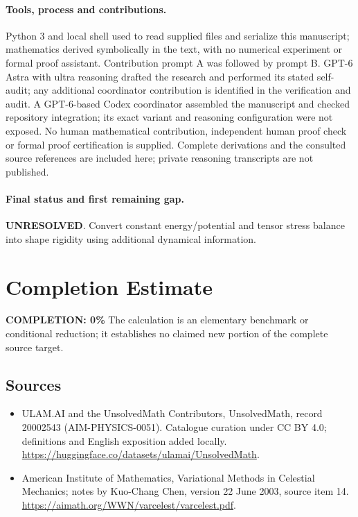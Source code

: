 \documentclass[11pt]{article}
\begin{document}
\paragraph{Tools, process and contributions.}
Python 3 and local shell used to read supplied files and serialize this manuscript; mathematics derived symbolically in the text, with no numerical experiment or formal proof assistant. Contribution prompt A was followed by prompt B. GPT-6 Astra with ultra reasoning drafted the research and performed its stated self-audit; any additional coordinator contribution is identified in the verification and audit. A GPT-6-based Codex coordinator assembled the manuscript and checked repository integration; its exact variant and reasoning configuration were not exposed. No human mathematical contribution, independent human proof check or formal proof certification is supplied. Complete derivations and the consulted source references are included here; private reasoning transcripts are not published.

\paragraph{Final status and first remaining gap.}
\textbf{UNRESOLVED}. Convert constant energy/potential and tensor stress balance into shape rigidity using additional dynamical information.

\section{Completion Estimate}
\noindent\textbf{COMPLETION: 0\%}
The calculation is an elementary benchmark or conditional reduction; it establishes no claimed new portion of the complete source target.

\subsection{Sources}
\begin{itemize}
\item[\hypertarget{source:20002543:1}{S1}] ULAM.AI and the UnsolvedMath Contributors, UnsolvedMath, record 20002543 (AIM-PHYSICS-0051). Catalogue curation under CC BY 4.0; definitions and English exposition added locally.
\url{https://huggingface.co/datasets/ulamai/UnsolvedMath}.
\item[\hypertarget{source:20002543:2}{S2}] American Institute of Mathematics, Variational Methods in Celestial Mechanics; notes by Kuo-Chang Chen, version 22 June 2003, source item 14.
\url{https://aimath.org/WWN/varcelest/varcelest.pdf}.
\end{itemize}
\label{end:20002543}
\end{document}
